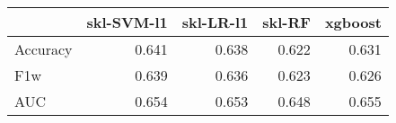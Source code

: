 \begin{tabular}{lrrrr}
\toprule
{} &  skl-SVM-l1 &  skl-LR-l1 &  skl-RF &  xgboost \\
\midrule
Accuracy &       0.641 &      0.638 &   0.622 &    0.631 \\
F1w      &       0.639 &      0.636 &   0.623 &    0.626 \\
AUC      &       0.654 &      0.653 &   0.648 &    0.655 \\
\bottomrule
\end{tabular}
